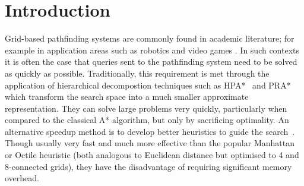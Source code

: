\section{Introduction}
\label{sec:introduction}

Grid-based pathfinding systems are commonly found in academic literature; for
example in application areas such as robotics \cite{choset05} and video games
\cite{botea04,sturtevant05,bjornsson06}.  
In such contexts it is often the case that queries sent to the pathfinding
system need to be solved as quickly as possible.  Traditionally, this
requirement is met through the application of hierarchical decompostion
techniques such as HPA*~\cite{botea04} and PRA* ~\cite{sturtevant05} which
transform the search space into a much smaller approximate representation.  They
can solve large problems very quickly, particularly when compared to the
classical A* algorithm, but only by sacrificing optimality.  An
alternative speedup method is to develop better heuristics to guide the
search~\cite{sturtevant09}.  Though usually very fast and
much more effective than the popular Manhattan or Octile heuristic (both
analogous to Euclidean distance but optimised to 4 and 8-connected grids), they
have the disadvantage of requiring significant memory overhead.


